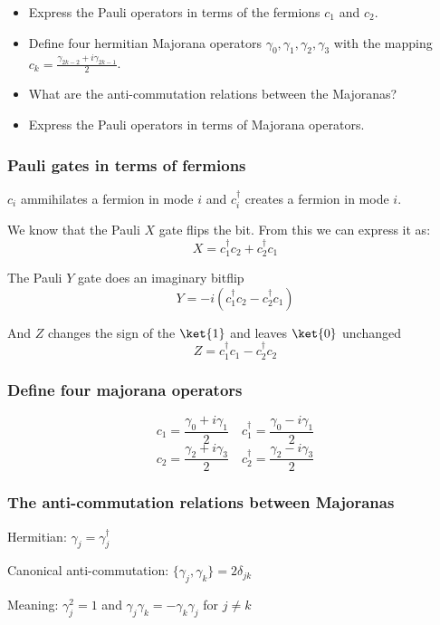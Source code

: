 \documentclass[11pt,landscape]{article}
\providecommand{\tightlist}{%
      \setlength{\itemsep}{0pt}\setlength{\parskip}{0pt}}
\begin{document}
\begin{itemize}
\tightlist
\item
  Express the Pauli operators in terms of the fermions \(c_1\) and
  \(c_2\).
\item
  Define four hermitian Majorana operators \(γ_0,γ_1,γ_2,γ_3\) with the
  mapping \(c_k=\displaystyle \frac{γ_{2k-2} + iγ_{2k-1}}{2}\).
\item
  What are the anti-commutation relations between the Majoranas?
\item
  Express the Pauli operators in terms of Majorana operators.
\end{itemize}

    \subsubsection{Pauli gates in terms of
fermions}\label{pauli-gates-in-terms-of-fermions}

\(c_i\) ammihilates a fermion in mode \(i\) and \(c_i^{†}\) creates a
fermion in mode \(i\).

We know that the Pauli \(X\) gate flips the bit. From this we can
express it as: \[X = c_1^{†} c_2 + c_2^{†} c_1 \]

The Pauli \(Y\) gate does an imaginary bitflip
\[ Y = -i(c_1^{†} c_2 - c_2^{†} c_1)\]

And \(Z\) changes the sign of the \(\ket{1}\) and leaves \(\ket{0}\)
unchanged \[Z = c_1^{†}c_1 - c_2^{†} c_2\]

\subsubsection{Define four majorana
operators}\label{define-four-majorana-operators}

\[c_1= \frac{γ_0 + iγ_1}{2} \quad c_1^{†}= \frac{γ_0 - iγ_1}{2} \]
\[c_2= \frac{γ_2 + iγ_3}{2} \quad c_2^{†}= \frac{γ_2 - iγ_3}{2} \]

\subsubsection{The anti-commutation relations between
Majoranas}\label{the-anti-commutation-relations-between-majoranas}

Hermitian: \(γ_j = γ_j^{†}\)

Canonical anti-commutation: \(\{γ_j,γ_k\}=2δ_{jk}\)

Meaning: \(γ_j^{2}=1\) and \(γ_j γ_k = -γ_k γ_j\) for \(j≠ k\)
\end{document}
